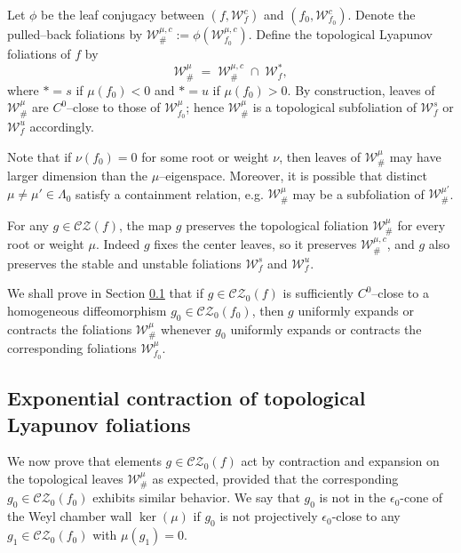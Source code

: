 \documentclass[11pt]{amsart}
\numberwithin{equation}{section}
\newcommand{\W}{\mathcal{W}}
\newcommand{\CZ}{\mathcal{CZ}}
\theoremstyle{plain}
\begin{document}
Let $\phi$ be the leaf conjugacy between $(f,\mathcal W^c_f)$ and
$(f_0,\mathcal W^c_{f_0})$. Denote the pulled–back foliations by
$\mathcal W^{\mu,c}_\# := \phi(\mathcal W^{\mu,c}_{f_0})$. Define
the topological Lyapunov foliations of $f$ by
\begin{equation}\label{equ:Wmuf}
\mathcal W^\mu_\# \;=\; \mathcal W^{\mu,c}_\# \;\cap\; \mathcal W^*_f,
\end{equation}
where $*=s$ if $\mu(f_0)<0$ and $*=u$ if $\mu(f_0)>0$. By construction,
leaves of $\mathcal W^\mu_\#$ are $C^0$–close to those of
$\mathcal W^\mu_{f_0}$; hence $\mathcal W^\mu_\#$ is a topological
subfoliation of $\mathcal W^s_f$ or $\mathcal W^u_f$ accordingly.

Note that if $\nu(f_0)=0$ for some root or weight $\nu$, then leaves of
$\mathcal W^\mu_\#$ may have larger dimension than the $\mu$–eigenspace.
Moreover, it is possible that distinct $\mu\neq\mu'\in\Lambda_0$ satisfy a
containment relation, e.g. $\mathcal W^\mu_\#$ may be a subfoliation of
$\mathcal W^{\mu'}_\#$.

For any $g\in\CZ(f)$, the map $g$ preserves the topological foliation
$\mathcal W^\mu_\#$ for every root or weight $\mu$. Indeed $g$ fixes the
center leaves, so it preserves $\mathcal W^{\mu,c}_\#$, and $g$ also
preserves the stable and unstable foliations $\mathcal W^s_f$ and
$\mathcal W^u_f$.

We shall prove in Section \ref{sec:contrfoli} that if
$g\in\CZ_0(f)$ is sufficiently $C^0$–close to a homogeneous diffeomorphism
$g_0\in\CZ_0(f_0)$, then $g$ uniformly expands or contracts the foliations
$\mathcal W^\mu_\#$ whenever $g_0$ uniformly expands or contracts the
corresponding foliations $\mathcal W^\mu_{f_0}$.


\subsection{Exponential contraction of topological Lyapunov foliations}\label{sec:contrfoli}
We now prove that elements $g \in \CZ_0(f)$ act by contraction and expansion on the topological leaves $\W^\mu_\#$ as expected, provided that the corresponding $g_0 \in \CZ_0(f_0)$ exhibits similar behavior. We say that $g_0$ is not in the $\epsilon_0$-cone of the Weyl chamber wall $\ker(\mu)$ if $g_0$ is not projectively $\epsilon_0$-close to any $g_1 \in \CZ_0(f_0)$ with $\mu(g_1) = 0$.
\end{document}
